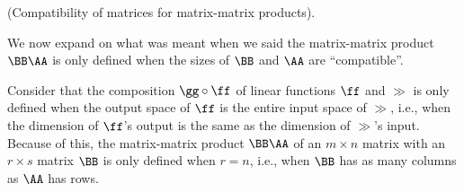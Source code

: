 \begin{remark}
    (Compatibility of matrices for matrix-matrix products). 
    
    We now expand on what was meant when we said the matrix-matrix product $\BB \AA$ is only defined when the sizes of $\BB$ and $\AA$ are ``compatible''.
    
    Consider that the composition $\gg \circ \ff$ of linear functions $\ff$ and $\gg$ is only defined when the output space of $\ff$ is the entire input space of $\gg$, i.e., when the dimension of $\ff$'s output is the same as the dimension of $\gg$'s input. Because of this, the matrix-matrix product $\BB \AA$ of an $m \times n$ matrix with an $r \times s$ matrix $\BB$ is only defined when $r = n$, i.e., when $\BB$ has as many columns as $\AA$ has rows.
\end{remark}


